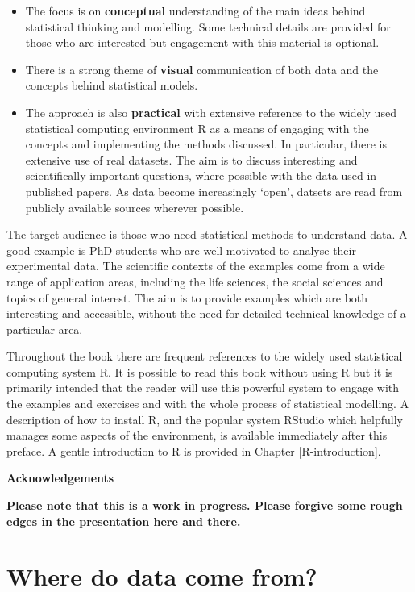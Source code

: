\documentclass[
]{book}
\providecommand{\tightlist}{%
  \setlength{\itemsep}{0pt}\setlength{\parskip}{0pt}}
\begin{document}
\begin{itemize}
\tightlist
\item
  The focus is on \textbf{conceptual} understanding of the main ideas behind statistical thinking and modelling. Some technical details are provided for those who are interested but engagement with this material is optional.
\item
  There is a strong theme of \textbf{visual} communication of both data and the concepts behind statistical models.
\item
  The approach is also \textbf{practical} with extensive reference to the widely used statistical computing environment R as a means of engaging with the concepts and implementing the methods discussed. In particular, there is extensive use of real datasets. The aim is to discuss interesting and scientifically important questions, where possible with the data used in published papers. As data become increasingly `open', datsets are read from publicly available sources wherever possible.
\end{itemize}

The target audience is those who need statistical methods to understand data. A good example is PhD students who are well motivated to analyse their experimental data. The scientific contexts of the examples come from a wide range of application areas, including the life sciences, the social sciences and topics of general interest. The aim is to provide examples which are both interesting and accessible, without the need for detailed technical knowledge of a particular area.

Throughout the book there are frequent references to the widely used statistical computing system R. It is possible to read this book without using R but it is primarily intended that the reader will use this powerful system to engage with the examples and exercises and with the whole process of statistical modelling. A description of how to install R, and the popular system RStudio which helpfully manages some aspects of the environment, is available immediately after this preface. A gentle introduction to R is provided in Chapter \ref{R-introduction}.

\textbf{Acknowledgements}

\textbf{Please note that this is a work in progress. Please forgive some rough edges in the presentation here and there.}

\chapter{Where do data come from?}\label{where-data}
\end{document}
